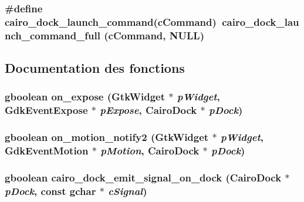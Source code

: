 \subsubsection{\setlength{\rightskip}{0pt plus 5cm}\#define cairo\_\-dock\_\-launch\_\-command(cCommand)~cairo\_\-dock\_\-launch\_\-command\_\-full (cCommand, NULL)}\label{cairo-dock-callbacks_8h_282e29f1d62472793c263217dbb01a24}




\subsection{Documentation des fonctions}
\subsubsection{\setlength{\rightskip}{0pt plus 5cm}gboolean on\_\-expose (GtkWidget $\ast$ {\em pWidget}, GdkEventExpose $\ast$ {\em pExpose}, {\bf CairoDock} $\ast$ {\em pDock})}\label{cairo-dock-callbacks_8h_edbc97fc4750f7b2ebe5f038b27e8fe0}


\subsubsection{\setlength{\rightskip}{0pt plus 5cm}gboolean on\_\-motion\_\-notify2 (GtkWidget $\ast$ {\em pWidget}, GdkEventMotion $\ast$ {\em pMotion}, {\bf CairoDock} $\ast$ {\em pDock})}\label{cairo-dock-callbacks_8h_87c81f77583280d3ed478bf85485c144}


\subsubsection{\setlength{\rightskip}{0pt plus 5cm}gboolean cairo\_\-dock\_\-emit\_\-signal\_\-on\_\-dock ({\bf CairoDock} $\ast$ {\em pDock}, const gchar $\ast$ {\em cSignal})}\label{cairo-dock-callbacks_8h_a852a8b23d2d5fc1c2e22a7b6af8d8a1}


